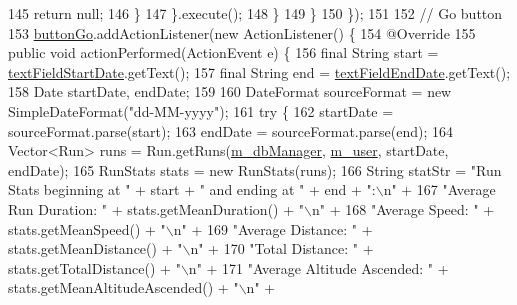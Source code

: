 \begin{DoxyCode}
145                             \textcolor{keywordflow}{return} null;
146                         \}
147                     \}.execute();
148                 \}
149             \}
150         \});
151 
152         \textcolor{comment}{// Go button}
153         \mbox{\hyperlink{classcom_1_1activitytracker_1_1_main_window_ad25fa99a0108ee160ede6865ecf3b6f0}{buttonGo}}.addActionListener(\textcolor{keyword}{new} ActionListener() \{
154             @Override
155             \textcolor{keyword}{public} \textcolor{keywordtype}{void} actionPerformed(ActionEvent e) \{
156                 \textcolor{keyword}{final} String start = \mbox{\hyperlink{classcom_1_1activitytracker_1_1_main_window_a57257f1403dc59df568de3ac51cdb90a}{textFieldStartDate}}.getText();
157                 \textcolor{keyword}{final} String end = \mbox{\hyperlink{classcom_1_1activitytracker_1_1_main_window_ab3ce75740bdeca26fec4325f1d5260e1}{textFieldEndDate}}.getText();
158                 Date startDate, endDate;
159 
160                 DateFormat sourceFormat = \textcolor{keyword}{new} SimpleDateFormat(\textcolor{stringliteral}{"dd-MM-yyyy"});
161                 \textcolor{keywordflow}{try} \{
162                     startDate = sourceFormat.parse(start);
163                     endDate = sourceFormat.parse(end);
164                     Vector<Run> runs = Run.getRuns(\mbox{\hyperlink{classcom_1_1activitytracker_1_1_main_window_ab2af51cb35794567e55564a4d3abbb79}{m\_dbManager}}, 
      \mbox{\hyperlink{classcom_1_1activitytracker_1_1_main_window_a96e28fa47e1740a7ddc16aa48406db85}{m\_user}}, startDate, endDate);
165                     RunStats stats = \textcolor{keyword}{new} RunStats(runs);
166                     String statStr = \textcolor{stringliteral}{"Run Stats beginning at "} + start + \textcolor{stringliteral}{" and ending at "} + end + \textcolor{stringliteral}{":\(\backslash\)n"} +
167                             \textcolor{stringliteral}{"Average Run Duration: "} + stats.getMeanDuration() + \textcolor{stringliteral}{"\(\backslash\)n"} +
168                             \textcolor{stringliteral}{"Average Speed: "} + stats.getMeanSpeed() + \textcolor{stringliteral}{"\(\backslash\)n"} +
169                             \textcolor{stringliteral}{"Average Distance: "} + stats.getMeanDistance() + \textcolor{stringliteral}{"\(\backslash\)n"} +
170                             \textcolor{stringliteral}{"Total Distance: "} + stats.getTotalDistance() + \textcolor{stringliteral}{"\(\backslash\)n"} +
171                             \textcolor{stringliteral}{"Average Altitude Ascended: "} + stats.getMeanAltitudeAscended() + \textcolor{stringliteral}{"\(\backslash\)n"} +

\end{DoxyCode}
